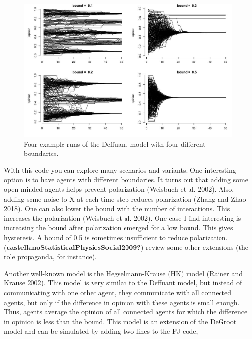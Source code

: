 \documentclass[
  letterpaper,
]{scrbook}
\begin{document}
\begin{figure}

{\centering \includegraphics[width=6.26389in,height=\textheight]{media/ch7/image8.jpg}

}

\caption{\label{fig-ch7-img8-old-96}Four example runs of the Deffuant
model with four different boundaries.}

\end{figure}

With this code you can explore many scenarios and variants. One
interesting option is to have agents with different boundaries. It turns
out that adding some open-minded agents helps prevent polarization
(Weisbuch et al. 2002). Also, adding some noise to X at each time step
reduces polarization (Zhang and Zhao 2018). One can also lower the bound
with the number of interactions. This increases the polarization
(Weisbuch et al. 2002). One case I find interesting is increasing the
bound after polarization emerged for a low bound. This gives hysteresis.
A bound of 0.5 is sometimes insufficient to reduce polarization.
(\textbf{castellanoStatisticalPhysicsSocial2009?}) review some other
extensions (the role propaganda, for instance).

Another well-known model is the Hegselmann-Krause (HK) model (Rainer and
Krause 2002). This model is very similar to the Deffuant model, but
instead of communicating with one other agent, they communicate with all
connected agents, but only if the difference in opinion with these
agents is small enough. Thus, agents average the opinion of all
connected agents for which the difference in opinion is less than the
bound. This model is an extension of the DeGroot model and can be
simulated by adding two lines to the FJ code,
\end{document}
